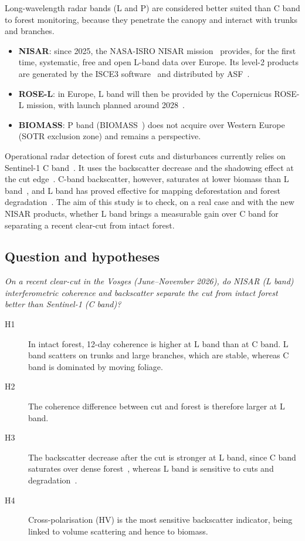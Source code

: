 \documentclass[11pt,a4paper]{article}
\begin{document}
Long-wavelength radar bands (L and P) are considered better suited than C band to forest monitoring, because they
penetrate the canopy and interact with trunks and branches.
\begin{itemize}
\item \textbf{NISAR}: since 2025, the NASA-ISRO NISAR mission~\cite{kellogg2020nisar,nisar2018handbook} provides,
  for the first time, systematic, free and open L-band data over Europe. Its level-2 products are generated by
  the ISCE3 software~\cite{isce3} and distributed by ASF~\cite{asf2026nisar}.
\item \textbf{ROSE-L}: in Europe, L band will then be provided by the Copernicus ROSE-L mission, with launch planned
  around 2028~\cite{esa2020rosel}.
\item \textbf{BIOMASS}: P band (BIOMASS~\cite{quegan2019biomass}) does not acquire over Western Europe (SOTR
  exclusion zone) and remains a perspective.
\end{itemize}

Operational radar detection of forest cuts and disturbances currently relies on Sentinel-1
C band~\cite{torres2012sentinel1}. It uses the backscatter decrease and the shadowing effect at the cut
edge~\cite{bouvet2018shadow,reiche2021radd}. C-band backscatter, however, saturates at lower biomass than
L band~\cite{imhoff1995saturation}, and L band has proved effective for mapping deforestation and forest
degradation~\cite{joshi2015mapping}. The aim of this study is to check, on a real case and with the new NISAR
products, whether L band brings a measurable gain over C band for separating a recent clear-cut from intact forest.

\subsection{Question and hypotheses}

\emph{On a recent clear-cut in the Vosges (June--November 2026), do NISAR (L band) interferometric coherence and
backscatter separate the cut from intact forest better than Sentinel-1 (C band)?}

\begin{description}
\item[H1] In intact forest, 12-day coherence is higher at L band than at C band. L band scatters on trunks and large
  branches, which are stable, whereas C band is dominated by moving foliage.
\item[H2] The coherence difference between cut and forest is therefore larger at L band.
\item[H3] The backscatter decrease after the cut is stronger at L band, since C band saturates over dense
  forest~\cite{imhoff1995saturation}, whereas L band is sensitive to cuts and degradation~\cite{joshi2015mapping}.
\item[H4] Cross-polarisation (HV) is the most sensitive backscatter indicator, being linked to volume scattering
  and hence to biomass.
\end{description}
\end{document}
